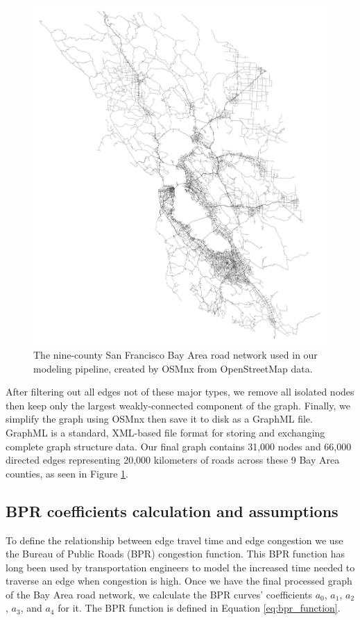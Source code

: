 \begin{figure}[htbp]
    \center
    \includegraphics[width=\textwidth]
    {graphics/bay_area_network.png}
    \caption{The nine-county San Francisco Bay Area road network used in our modeling pipeline, created by OSMnx from OpenStreetMap data.}
    \label{fig:bay_area_road_network}
\end{figure}

After filtering out all edges not of these major types, we remove all isolated nodes then keep only the largest weakly-connected component of the graph. Finally, we simplify the graph using OSMnx then save it to disk as a GraphML file. GraphML is a standard, XML-based file format for storing and exchanging complete graph structure data. Our final graph contains 31,000 nodes and 66,000 directed edges representing 20,000 kilometers of roads across these 9 Bay Area counties, as seen in Figure \ref{fig:bay_area_road_network}.

\subsection{BPR coefficients calculation and assumptions}
To define the relationship between edge travel time and edge congestion we use the Bureau of Public Roads (BPR) congestion function. This BPR function has long been used by transportation engineers to model the increased time needed to traverse an edge when congestion is high. Once we have the final processed graph of the Bay Area road network, we calculate the BPR  curves' coefficients $a_0$, $a_1$, $a_2$, $a_3$, and $a_4$ for it. The BPR function is defined in Equation \ref{eq:bpr_function}.

